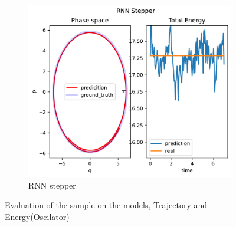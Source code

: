 \begin{figure}[H]
\begin{subfigure}[b]{0.3\textwidth}
		\centering
		\includegraphics[width=\textwidth]{chapters/chapter5/osci_rne_ps.pdf}
		\caption{RNN stepper}
	\end{subfigure}
	\label{osci_traj}
	\caption{Evaluation of the sample on the models, Trajectory and Energy(Oscilator)}
\end{figure}
	

 

